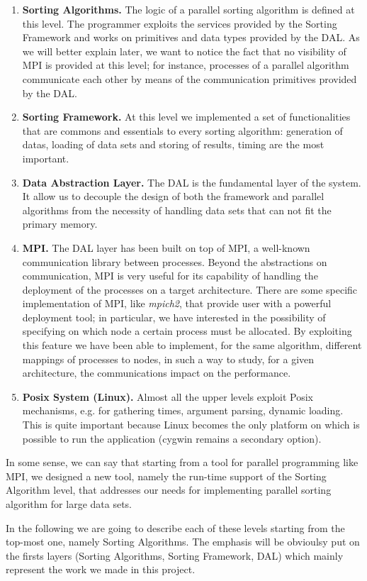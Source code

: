 \begin{enumerate}
\item \textbf{Sorting Algorithms.} The logic of a parallel sorting algorithm is defined at this level. The programmer exploits the services provided by the Sorting Framework and works on primitives and data types provided by the DAL. As we will better explain later, we want to notice the fact that no visibility of MPI is provided at this level; for instance, processes of a parallel algorithm communicate each other by means of the communication primitives provided by the DAL.  
\item \textbf{Sorting Framework.} At this level we implemented a set of functionalities that are commons and essentials to every sorting algorithm: generation of datas, loading of data sets and storing of results, timing are the most important. 
\item \textbf{Data Abstraction Layer.} The DAL is the fundamental layer of the system. It allow us to decouple the design of both the framework and parallel algorithms from the necessity of handling data sets that can not fit the primary memory. 
\item \textbf{MPI.} The DAL layer has been built on top of MPI, a well-known communication library between processes. Beyond the abstractions on communication, MPI is very useful for its capability of handling the deployment of the processes on a target architecture. There are some specific implementation of MPI, like \textit{mpich2}, that provide user with a powerful deployment tool; in particular, we have interested in the possibility of specifying on which node a certain process must be allocated. By exploiting this feature we have been able to implement, for the same algorithm, different mappings of processes to nodes, in such a way to study, for a given architecture, the communications impact on the performance. 
\item \textbf{Posix System (Linux).} Almost all the upper levels exploit Posix mechanisms, e.g. for gathering times, argument parsing, dynamic loading. This is quite important because Linux becomes the only platform on which is possible to run the application (cygwin remains a secondary option). 
\end{enumerate}
In some sense, we can say that starting from a tool for parallel programming like MPI, we designed a new tool, namely the run-time support of the Sorting Algorithm level, that addresses our needs for implementing parallel sorting algorithm for large data sets. 

In the following we are going to describe each of these levels starting from the top-most one, namely Sorting Algorithms. The emphasis will be obvioulsy put on the firsts layers (Sorting Algorithms, Sorting Framework, DAL) which mainly represent the work we made in this project.

